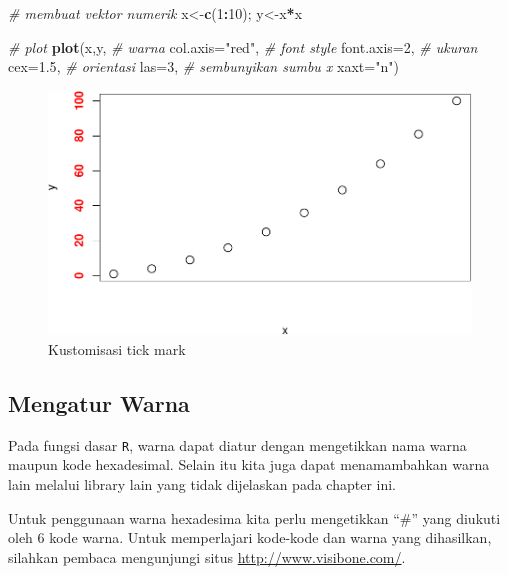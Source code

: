 \documentclass[]{book}
\newenvironment{Shaded}{\begin{snugshade}}{\end{snugshade}}
\newcommand{\KeywordTok}[1]{\textcolor[rgb]{0.13,0.29,0.53}{\textbf{#1}}}
\newcommand{\DataTypeTok}[1]{\textcolor[rgb]{0.13,0.29,0.53}{#1}}
\newcommand{\DecValTok}[1]{\textcolor[rgb]{0.00,0.00,0.81}{#1}}
\newcommand{\FloatTok}[1]{\textcolor[rgb]{0.00,0.00,0.81}{#1}}
\newcommand{\StringTok}[1]{\textcolor[rgb]{0.31,0.60,0.02}{#1}}
\newcommand{\CommentTok}[1]{\textcolor[rgb]{0.56,0.35,0.01}{\textit{#1}}}
\newcommand{\OperatorTok}[1]{\textcolor[rgb]{0.81,0.36,0.00}{\textbf{#1}}}
\newcommand{\NormalTok}[1]{#1}
\begin{document}
\begin{Shaded}
\begin{Highlighting}[]
\CommentTok{# membuat vektor numerik}
\NormalTok{x<-}\KeywordTok{c}\NormalTok{(}\DecValTok{1}\OperatorTok{:}\DecValTok{10}\NormalTok{); y<-x}\OperatorTok{*}\NormalTok{x}

\CommentTok{# plot}
\KeywordTok{plot}\NormalTok{(x,y,}
     \CommentTok{# warna}
     \DataTypeTok{col.axis=}\StringTok{"red"}\NormalTok{,}
     \CommentTok{# font style}
     \DataTypeTok{font.axis=}\DecValTok{2}\NormalTok{,}
     \CommentTok{# ukuran}
     \DataTypeTok{cex=}\FloatTok{1.5}\NormalTok{,}
     \CommentTok{# orientasi}
     \DataTypeTok{las=}\DecValTok{3}\NormalTok{,}
     \CommentTok{# sembunyikan sumbu x}
     \DataTypeTok{xaxt=}\StringTok{"n"}\NormalTok{)}
\end{Highlighting}
\end{Shaded}

\begin{figure}

{\centering \includegraphics[width=0.7\linewidth]{EnvStat_files/figure-latex/axis3-1} 

}

\caption{Kustomisasi tick mark}\label{fig:axis3}
\end{figure}

\subsection{Mengatur Warna}\label{mengatur-warna}

Pada fungsi dasar \texttt{R}, warna dapat diatur dengan mengetikkan nama
warna maupun kode hexadesimal. Selain itu kita juga dapat menamambahkan
warna lain melalui library lain yang tidak dijelaskan pada chapter ini.

Untuk penggunaan warna hexadesima kita perlu mengetikkan ``\#'' yang
diukuti oleh 6 kode warna. Untuk memperlajari kode-kode dan warna yang
dihasilkan, silahkan pembaca mengunjungi situs
\url{http://www.visibone.com/}.
\end{document}
